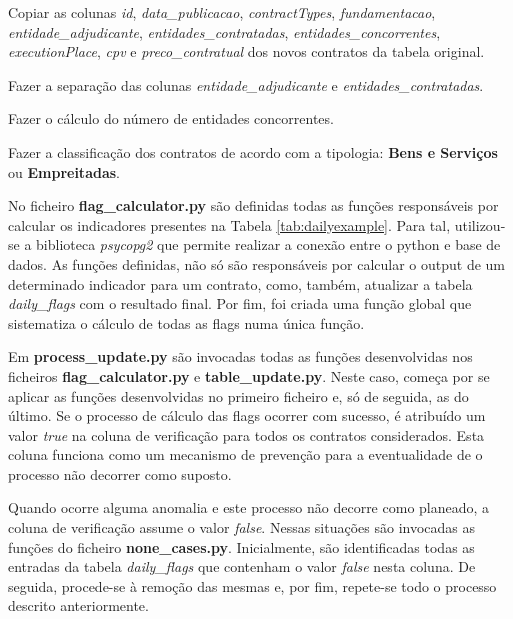 \begin{my_enumerate}
	
	\item Copiar as colunas \textit{id}, \textit{data\_publicacao}, 	\textit{contractTypes}, \textit{fundamentacao}, \textit{entidade\_adjudicante}, \textit{entidades\_contratadas}, \textit{entidades\_concorrentes}, \textit{executionPlace}, \textit{cpv} e \textit{preco\_contratual} dos novos contratos da tabela original.
	
	\item Fazer a separação das colunas \textit{entidade\_adjudicante} e \textit{entidades\_contratadas}.
	
	\item Fazer o cálculo do número de entidades concorrentes.
	
	\item Fazer a classificação dos contratos de acordo com a tipologia: \textbf{Bens e Serviços} ou \textbf{Empreitadas}.
	
\end{my_enumerate}



No ficheiro \textbf{flag\_calculator.py} são definidas todas as funções responsáveis por calcular os indicadores presentes na Tabela \ref{tab:dailyexample}. Para tal, utilizou-se a biblioteca \textit{psycopg2} que permite realizar a conexão entre o python e base de dados. As funções definidas, não só são responsáveis por calcular o output de um determinado indicador para um contrato, como, também, atualizar a tabela \textit{daily\_flags} com o resultado final. Por fim, foi criada uma função global que sistematiza o cálculo de todas as flags numa única função.

Em \textbf{process\_update.py} são invocadas todas as funções desenvolvidas nos ficheiros \textbf{flag\_calculator.py} e \textbf{table\_update.py}. Neste caso, começa por se aplicar as funções desenvolvidas no primeiro ficheiro e, só de seguida, as do último. Se o processo de cálculo das flags ocorrer com sucesso, é atribuído um valor \textit{true} na coluna de verificação para todos os contratos considerados. Esta coluna funciona como um mecanismo de prevenção para a eventualidade de o processo não decorrer como suposto. 

Quando ocorre alguma anomalia e este processo não decorre como planeado, a coluna de verificação assume o valor \textit{false}. Nessas situações são invocadas as funções do ficheiro \textbf{none\_cases.py}. Inicialmente, são identificadas todas as entradas da tabela \textit{daily\_flags} que contenham o valor \textit{false} nesta coluna. De seguida, procede-se à remoção das mesmas e, por fim, repete-se todo o processo descrito anteriormente.


